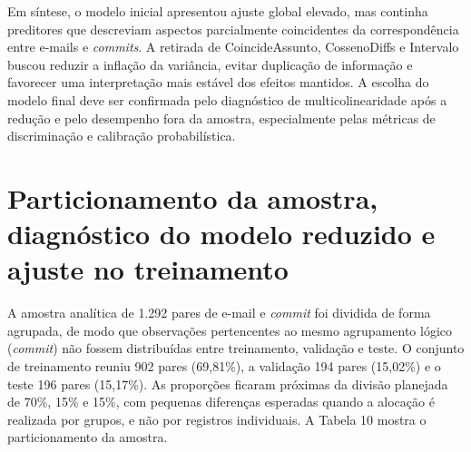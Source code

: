 Em síntese, o modelo inicial apresentou ajuste global elevado, mas
continha preditores que descreviam aspectos parcialmente coincidentes da
correspondência entre e-mails e \textit{commits}. A retirada de
CoincideAssunto, CossenoDiffs e Intervalo buscou reduzir a inflação da
variância, evitar duplicação de informação e favorecer uma interpretação
mais estável dos efeitos mantidos. A escolha do modelo final deve ser
confirmada pelo diagnóstico de multicolinearidade após a redução e pelo
desempenho fora da amostra, especialmente pelas métricas de
discriminação e calibração probabilística.

\section{Particionamento da amostra, diagnóstico do modelo reduzido e ajuste no treinamento}
A amostra analítica de 1.292 pares de e-mail e \textit{commit} foi dividida de forma agrupada, de modo que observações pertencentes ao mesmo agrupamento lógico (\textit{commit}) não fossem distribuídas entre treinamento, validação e teste. O conjunto de treinamento reuniu 902 pares (69,81\%), a validação 194 pares (15,02\%) e o teste 196 pares (15,17\%). As proporções ficaram próximas da divisão planejada de 70\%, 15\% e 15\%, com pequenas diferenças esperadas quando a alocação é realizada por grupos, e não por registros individuais. A Tabela 10 mostra o particionamento da amostra.

